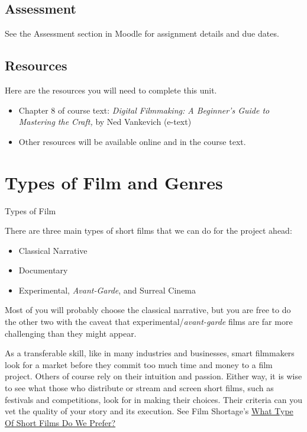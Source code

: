\documentclass[
]{book}
\providecommand{\tightlist}{%
  \setlength{\itemsep}{0pt}\setlength{\parskip}{0pt}}
\begin{document}
\hypertarget{assessment-13}{%
\subsection*{Assessment}\label{assessment-13}}

See the Assessment section in Moodle for assignment details and due dates.

\hypertarget{resources-7}{%
\subsection*{Resources}\label{resources-7}}

Here are the resources you will need to complete this unit.

\begin{itemize}
\tightlist
\item
  Chapter 8 of course text: \emph{Digital Filmmaking: A Beginner's Guide to Mastering the Craft,} by Ned Vankevich (e-text)
\item
  Other resources will be available online and in the course text.
\end{itemize}

\hypertarget{types-of-film-and-genres}{%
\section{Types of Film and Genres}\label{types-of-film-and-genres}}

{Types of Film }

There are three main types of short films that we can do for the project ahead:

\begin{itemize}
\tightlist
\item
  Classical Narrative
\item
  Documentary
\item
  Experimental, \emph{Avant-Garde}, and Surreal Cinema
\end{itemize}

Most of you will probably choose the classical narrative, but you are free to do the other two with the caveat that experimental/\emph{avant-garde} films are far more challenging than they might appear.

As a transferable skill, like in many industries and businesses, smart filmmakers look for a market before they commit too much time and money to a film project. Others of course rely on their intuition and passion. Either way, it is wise to see what those who distribute or stream and screen short films, such as festivals and competitions, look for in making their choices. Their criteria can you vet the quality of your story and its execution. See Film Shortage's \href{https://filmshortage.com/what-we-like/}{What Type Of Short Films Do We Prefer?}
\end{document}
